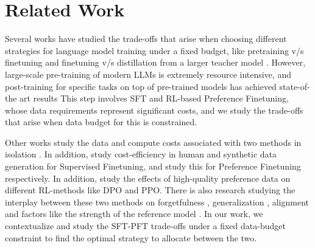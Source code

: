 \section{Related Work}

Several works have studied the trade-offs that arise when choosing different strategies for language model training under a fixed budget, like pretraining v/s finetuning  \citep{bai-etal-2021-pre} and finetuning v/s distillation from a larger teacher model \citet{kang-etal-2023-distill, busbridge2025distillationscalinglaws}. However, large-scale pre-training of modern LLMs is extremely resource intensive, and post-training for specific tasks on top of pre-trained models has achieved state-of-the art results \citep{dubey2024llama, guo2025deepseek, lambert2025tulu3pushingfrontiers} This step involves SFT and RL-based Preference Finetuning, whose data requirements represent significant costs, and we study the trade-offs that arise when data budget for this is constrained. 


Other works study the data and compute costs associated with two methods in isolation \citep{Li_2023, Gilardi_2023, liu2024bestpracticeslessonslearned, tan-etal-2024-large, raghavendra2024revisitingsuperficialalignmenthypothesis, chan2024balancingcosteffectivenesssynthetic}. In addition, \citet{wang2023selfinstructaligninglanguagemodels}  study cost-efficiency in human and synthetic data generation for Supervised Finetuning, and \citet{pmlr-v235-lee24t} study this for Preference Finetuning respectively. In addition, \citet{ivison2024unpackingdpoppodisentangling} study the effects of high-quality preference data on different RL-methods like DPO and PPO. There is also research studying the interplay between these two methods on forgetfulness \citep{fernando2025mitigatingforgettingllmsupervised}, generalization \citep{kirk2024understanding}, alignment \citep{saeidi2025insightsalignmentevaluatingdpo} and factors like the strength of the reference model \citet{liu2024understandingreferencepoliciesdirect}. In our work, we contextualize and study the SFT-PFT trade-offs under a fixed data-budget constraint to find the optimal strategy to allocate between the two.   
